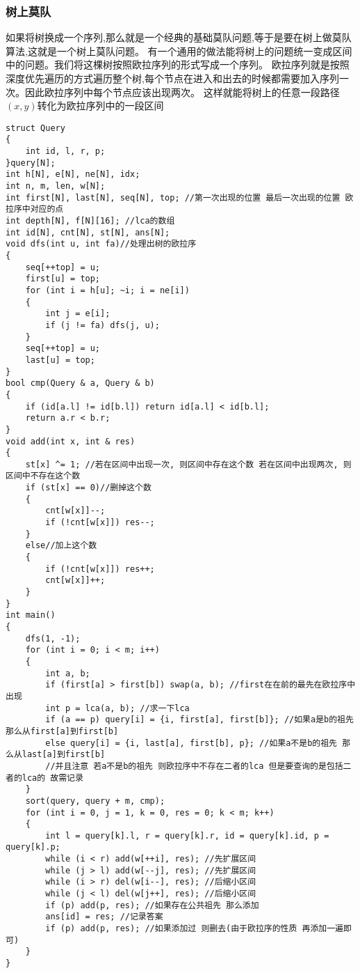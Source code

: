 \documentclass[a4paper, fontset=none]{ctexart}
\begin{document}
\subsubsection{树上莫队}
如果将树换成一个序列,那么就是一个经典的基础莫队问题,等于是要在树上做莫队算法,这就是一个树上莫队问题。
有一个通用的做法能将树上的问题统一变成区间中的问题。我们将这棵树按照欧拉序列的形式写成一个序列。
欧拉序列就是按照深度优先遍历的方式遍历整个树,每个节点在进入和出去的时候都需要加入序列一次。因此欧拉序列中每个节点应该出现两次。
这样就能将树上的任意一段路径$(x, y)$转化为欧拉序列中的一段区间
\begin{verbatim}
struct Query
{
    int id, l, r, p;
}query[N];
int h[N], e[N], ne[N], idx;
int n, m, len, w[N];
int first[N], last[N], seq[N], top; //第一次出现的位置 最后一次出现的位置 欧拉序中对应的点
int depth[N], f[N][16]; //lca的数组
int id[N], cnt[N], st[N], ans[N];
void dfs(int u, int fa)//处理出树的欧拉序
{
    seq[++top] = u;
    first[u] = top;
    for (int i = h[u]; ~i; i = ne[i])
    {
        int j = e[i];
        if (j != fa) dfs(j, u);
    }
    seq[++top] = u;
    last[u] = top;
}
bool cmp(Query & a, Query & b)
{
    if (id[a.l] != id[b.l]) return id[a.l] < id[b.l];
    return a.r < b.r;
}
void add(int x, int & res)
{
    st[x] ^= 1; //若在区间中出现一次, 则区间中存在这个数 若在区间中出现两次, 则区间中不存在这个数
    if (st[x] == 0)//删掉这个数
    {
        cnt[w[x]]--;
        if (!cnt[w[x]]) res--;
    }
    else//加上这个数
    {
        if (!cnt[w[x]]) res++;
        cnt[w[x]]++;
    }
}
int main()
{
    dfs(1, -1);
    for (int i = 0; i < m; i++)
    {
        int a, b;
        if (first[a] > first[b]) swap(a, b); //first在在前的最先在欧拉序中出现
        int p = lca(a, b); //求一下lca
        if (a == p) query[i] = {i, first[a], first[b]}; //如果a是b的祖先 那么从first[a]到first[b]
        else query[i] = {i, last[a], first[b], p}; //如果a不是b的祖先 那么从last[a]到first[b]
        //并且注意 若a不是b的祖先 则欧拉序中不存在二者的lca 但是要查询的是包括二者的lca的 故需记录
    }
    sort(query, query + m, cmp);
    for (int i = 0, j = 1, k = 0, res = 0; k < m; k++)
    {
        int l = query[k].l, r = query[k].r, id = query[k].id, p = query[k].p;
        while (i < r) add(w[++i], res); //先扩展区间
        while (j > l) add(w[--j], res); //先扩展区间
        while (i > r) del(w[i--], res); //后缩小区间
        while (j < l) del(w[j++], res); //后缩小区间
        if (p) add(p, res); //如果存在公共祖先 那么添加
        ans[id] = res; //记录答案
        if (p) add(p, res); //如果添加过 则删去(由于欧拉序的性质 再添加一遍即可)
    }
}
\end{verbatim}
\end{document}
